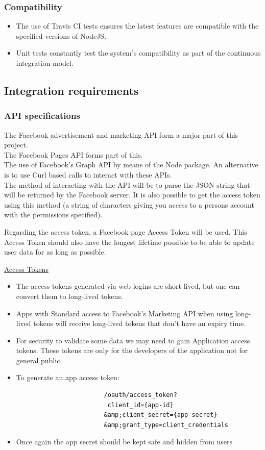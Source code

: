 \documentclass{article}
\begin{document}
		\subsubsection{Compatibility}
		\begin{itemize}
			\item The use of Travis CI tests ensures the latest features are compatible with the specified versions of NodeJS.
			\item Unit tests constantly test the system's compatibility as part of the continuous integration model.
		\end{itemize} 

	\subsection{Integration requirements}
		\subsubsection{API specifications}
			The Facebook advertisement and marketing API form a major part of this project.\\
			The Facebook Pages API forms part of this.\\
			The use of Facebook's Graph API by means of the Node package.
			An alternative is to use Curl based calls to interact with these APIs.\\
			The method of interacting with the API will be to parse the JSON string that will be returned by the Facebook server. It is also possible to get the access token using this method (a string of characters giving you access to a persons  account with the permissions specified).

			Regarding the access token, a Facebook page Access Token will be used. This Access Token should also have the longest lifetime possible to be able to update user data for as long as possible.

			\href{https://developers..com/docs/-login/access-tokens}{Access Tokens}
			\begin{itemize}
				\item The access tokens generated via web logins are short-lived, but one can convert them to long-lived tokens.
				\item Apps with Standard access to Facebook's Marketing API when using long-lived tokens will receive long-lived tokens that don't have an expiry time.
				\item For security to validate some data we may need to gain Application access tokens. These tokens are only for the developers of the application not for general public.
				\item To generate an app access token:
					\begin{verbatim}
						/oauth/access_token?
					     client_id={app-id}
					    &amp;client_secret={app-secret}
					    &amp;grant_type=client_credentials
					\end{verbatim}
				\item Once again the app secret should be kept safe and hidden from users
			\end{itemize}
			
\end{document}
